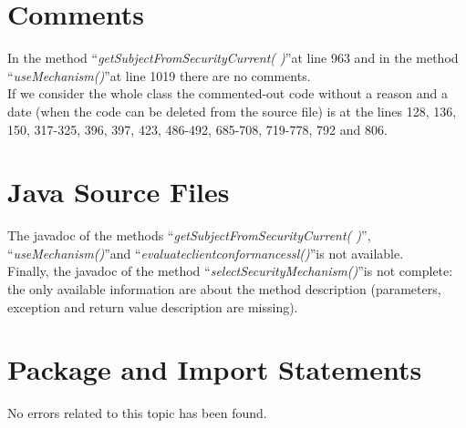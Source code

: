 \documentclass[\mainpath/main]{subfiles}
\begin{document}
\section{Comments}
\label{CodeInspectionChecklist:Comments}
In the method \textquotedblleft \textit{getSubjectFromSecurityCurrent( )}\textquotedblright at line 963 and in the method \textquotedblleft \textit{useMechanism(\textellipsis)}\textquotedblright at line 1019 there are no comments.\\
If we consider the whole class the commented-out code without a reason and a date (when the code can be deleted from the source file) is at the lines 128, 136, 150, 317-325, 396, 397, 423, 486-492, 685-708, 719-778, 792 and 806.

\section{Java Source Files}
\label{CodeInspectionChecklist:JaveSourceFiles}
The javadoc of the methods \textquotedblleft \textit{getSubjectFromSecurityCurrent( )}\textquotedblright , \textquotedblleft \textit{useMechanism(\textellipsis)}\textquotedblright  and \textquotedblleft \textit{evaluate\textunderscore client\textunderscore conformance\textunderscore ssl(\textellipsis)}\textquotedblright is not available.\\
Finally, the javadoc of the method \textquotedblleft \textit{selectSecurityMechanism(\textellipsis)}\textquotedblright  is not complete: the only available information are about the method description (parameters, exception and return value description are missing).

\section{Package and Import Statements}
\label{CodeInspectionChecklist:PackageandImportStatements}
No errors related to this topic has been found.
\end{document}
